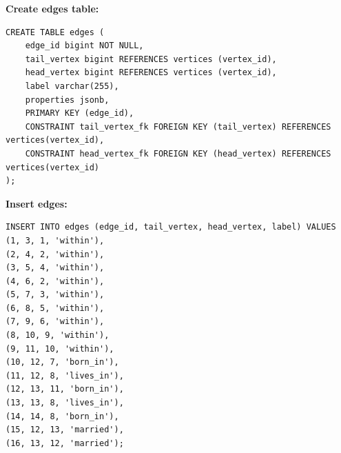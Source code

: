 \documentclass[14pt,a4paper]{extarticle}
\begin{document}
	\newpage

	\noindent \textbf{Create edges table:}
	\begin{lstlisting}[style=sql]
CREATE TABLE edges (
	edge_id bigint NOT NULL,
	tail_vertex bigint REFERENCES vertices (vertex_id),
	head_vertex bigint REFERENCES vertices (vertex_id),
	label varchar(255),
	properties jsonb,
	PRIMARY KEY (edge_id),
	CONSTRAINT tail_vertex_fk FOREIGN KEY (tail_vertex) REFERENCES vertices(vertex_id),
	CONSTRAINT head_vertex_fk FOREIGN KEY (head_vertex) REFERENCES vertices(vertex_id)
);
	\end{lstlisting}

	\noindent \textbf{Insert edges:}
	\begin{lstlisting}[style=sql]
INSERT INTO edges (edge_id, tail_vertex, head_vertex, label) VALUES
(1, 3, 1, 'within'),
(2, 4, 2, 'within'),
(3, 5, 4, 'within'),
(4, 6, 2, 'within'),
(5, 7, 3, 'within'),
(6, 8, 5, 'within'),
(7, 9, 6, 'within'),
(8, 10, 9, 'within'),
(9, 11, 10, 'within'),
(10, 12, 7, 'born_in'),
(11, 12, 8, 'lives_in'),
(12, 13, 11, 'born_in'),
(13, 13, 8, 'lives_in'),
(14, 14, 8, 'born_in'),
(15, 12, 13, 'married'),
(16, 13, 12, 'married');
	\end{lstlisting}



	

\end{document}
